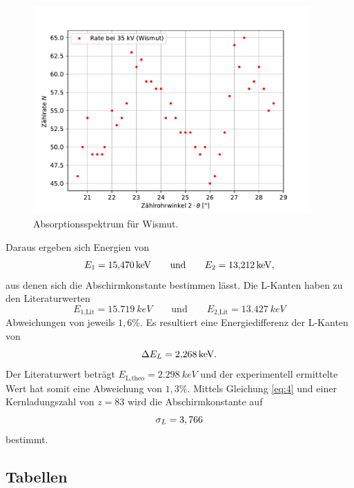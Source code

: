 \begin{figure}[H]
    \centering
    \includegraphics[height=8cm]{Auswertung/Wismut.pdf}
    \caption{Absorptionsspektrum für Wismut.}
    \label{fig:wismut}
\end{figure}

Daraus ergeben sich Energien von
\begin{equation}
    E_1 = \SI{15,470}{keV}  \qquad \text{und}   \qquad E_2 = \SI{13,212}{keV},  \notag
\end{equation}
aus denen sich die Abschirmkonstante bestimmen lässt.
Die L-Kanten haben zu den Literaturwerten
\begin{equation}
    E_\text{1,Lit} = \SI{15,719}{keV} \qquad \text{und} \qquad E_\text{2,Lit} = \SI{13,427}{keV}
\end{equation}
Abweichungen von jeweils $1,6 \%$.
Es resultiert eine Energiedifferenz der L-Kanten von
\begin{equation}
    \Delta E_L = \SI{2,268}{keV}.   \notag
\end{equation}
Der Literaturwert beträgt $E_\text{L,theo} = \SI{2,298}{keV}$ \cite{2} und der experimentell ermittelte Wert hat somit eine Abweichung von $1,3 \%$.
Mittels Gleichung \ref{eq:4} und einer Kernladungszahl von $z = 83$ wird die Abschirmkonstante auf
\begin{equation}
     \sigma_L = 3,766   \notag
\end{equation}
bestimmt.

\subsection{Tabellen}

